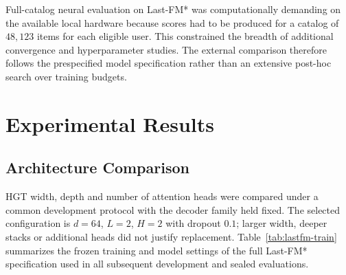 Full-catalog neural evaluation on Last-FM* was computationally demanding on the available local hardware because scores had to be produced for a catalog of $48{,}123$ items for each eligible user.
This constrained the breadth of additional convergence and hyperparameter studies.
The external comparison therefore follows the prespecified model specification rather than an extensive post-hoc search over training budgets.

\section{Experimental Results}
\label{sec:lastfm-results}

\subsection{Architecture Comparison}
\label{sec:lastfm-backbone}

HGT width, depth and number of attention heads were compared under a common development protocol with the decoder family held fixed.
The selected configuration is $d=64$, $L=2$, $H=2$ with dropout $0.1$; larger width, deeper stacks or additional heads did not justify replacement.
Table~\ref{tab:lastfm-train} summarizes the frozen training and model settings of the full Last-FM* specification used in all subsequent development and sealed evaluations.

